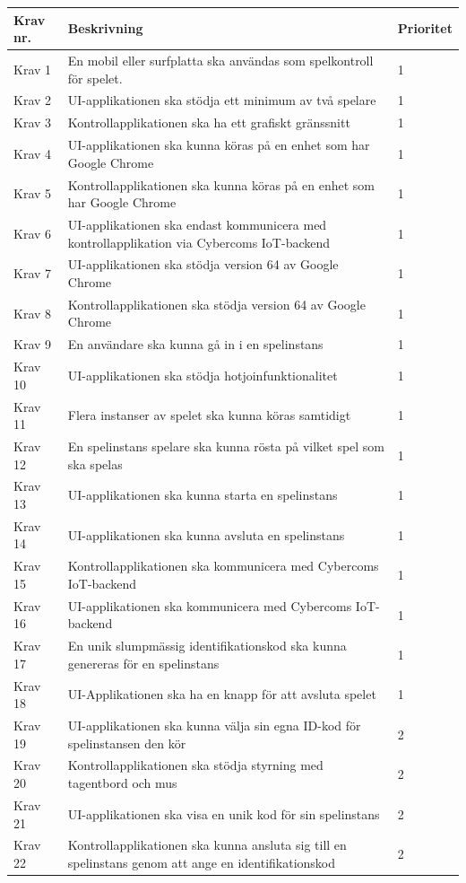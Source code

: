 \documentclass[10pt]{article}
\begin{document}
	\begin{tabular}{| p{2cm} | p{8cm} | p{2cm}|}
		\hline
		
		\textbf{Krav nr.} & \textbf{Beskrivning} &\textbf{Prioritet} \\ \hline
		Krav 1 & En mobil eller surfplatta ska användas som spelkontroll för spelet. & 1 \\ \hline
		Krav 2 & UI-applikationen ska stödja ett minimum av två spelare & 1 \\ \hline
		Krav 3 & Kontrollapplikationen ska ha ett grafiskt gränssnitt & 1 \\ \hline
		Krav 4 & UI-applikationen ska kunna köras på en enhet som har Google Chrome & 1 \\ \hline
		Krav 5 & Kontrollapplikationen ska kunna köras på en enhet som har Google Chrome & 1 \\ \hline
		Krav 6 & UI-applikationen ska endast kommunicera med \newline kontrollapplikation via  Cybercoms IoT-backend & 1 \\ \hline
		Krav 7 & UI-applikationen ska stödja version 64 av Google Chrome & 1 \\ \hline
		Krav 8 & Kontrollapplikationen ska stödja version 64 av Google Chrome & 1 \\ \hline
		Krav 9 & En användare ska kunna gå in i en spelinstans & 1 \\ \hline
		Krav 10 & UI-applikationen ska stödja hotjoinfunktionalitet & 1 \\ \hline
		Krav 11 & Flera instanser av spelet ska kunna köras samtidigt & 1 \\ \hline
		Krav 12 & En spelinstans spelare ska kunna rösta på vilket spel som ska spelas & 1 \\ \hline
		Krav 13 & UI-applikationen ska kunna starta en spelinstans & 1 \\ \hline
		Krav 14 & UI-applikationen ska kunna avsluta en spelinstans & 1 \\ \hline
		Krav 15 & Kontrollapplikationen ska kommunicera med Cybercoms IoT-backend & 1 \\ \hline
		Krav 16 & UI-applikationen ska kommunicera med Cybercoms IoT-backend & 1\\ \hline
		Krav 17 & En unik slumpmässig identifikationskod ska kunna genereras för en spelinstans & 1 \\ \hline
		Krav 18 & UI-Applikationen ska ha en knapp för att avsluta spelet & 1 \\ \hline
		Krav 19 & UI-applikationen ska kunna välja sin egna ID-kod för spelinstansen den kör & 2 \\ \hline
		Krav 20 & Kontrollapplikationen ska stödja styrning med tagentbord och mus & 2 \\ \hline
		Krav 21 & UI-applikationen ska visa en unik kod för sin spelinstans & 2 \\ \hline
		Krav 22 & Kontrollapplikationen ska kunna ansluta sig till en spelinstans genom att ange en identifikationskod & 2 \\ \hline
		
		
		
	\end{tabular}
	
\end{document}
